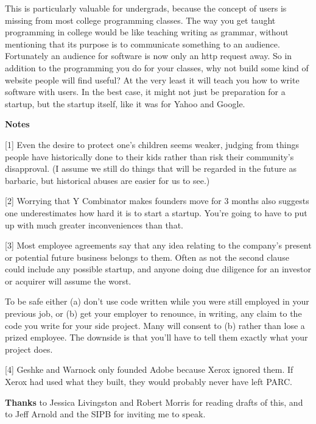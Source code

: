 This is particularly valuable for undergrads, because the concept of
users is missing from most college programming classes. The way you get
taught programming in college would be like teaching writing as grammar,
without mentioning that its purpose is to communicate something to an
audience. Fortunately an audience for software is now only an http
request away. So in addition to the programming you do for your classes,
why not build some kind of website people will find useful? At the very
least it will teach you how to write software with users. In the best
case, it might not just be preparation for a startup, but the startup
itself, like it was for Yahoo and Google.

\textbf{Notes}

{[}1{]} Even the desire to protect one's children seems weaker, judging
from things people have historically done to their kids rather than risk
their community's disapproval. (I assume we still do things that will be
regarded in the future as barbaric, but historical abuses are easier for
us to see.)

{[}2{]} Worrying that Y Combinator makes founders move for 3 months also
suggests one underestimates how hard it is to start a startup. You're
going to have to put up with much greater inconveniences than that.

{[}3{]} Most employee agreements say that any idea relating to the
company's present or potential future business belongs to them. Often as
not the second clause could include any possible startup, and anyone
doing due diligence for an investor or acquirer will assume the worst.

To be safe either (a) don't use code written while you were still
employed in your previous job, or (b) get your employer to renounce, in
writing, any claim to the code you write for your side project. Many
will consent to (b) rather than lose a prized employee. The downside is
that you'll have to tell them exactly what your project does.

{[}4{]} Geshke and Warnock only founded Adobe because Xerox ignored
them. If Xerox had used what they built, they would probably never have
left PARC.

\textbf{Thanks} to Jessica Livingston and Robert Morris for reading
drafts of this, and to Jeff Arnold and the SIPB for inviting me to
speak.
